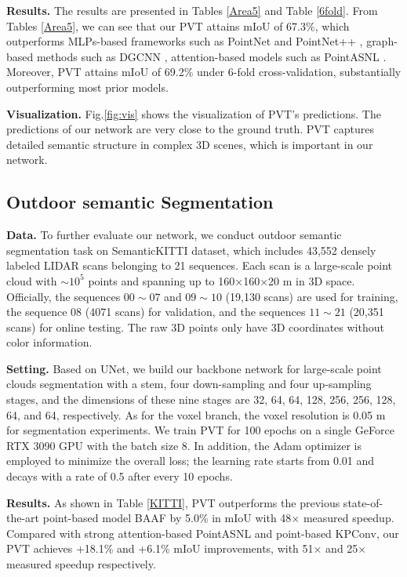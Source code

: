 \documentclass[10pt,twocolumn,letterpaper]{article}
\begin{document}
\textbf{Results.} The results are presented in Tables \ref{Area5} and Table \ref{6fold}. From Tables \ref{Area5}, we can see that our PVT attains mIoU of 67.3\%, which outperforms MLPs-based frameworks such as PointNet \cite{qi2017pointnet} and PointNet++ \cite{qi2017pointnet++}, graph-based methods such as DGCNN \cite{2018Dynamic}, attention-based models such as PointASNL \cite{2020PointASNL}. Moreover, PVT attains mIoU of 69.2\% under 6-fold cross-validation, substantially outperforming most prior models.

\textbf{Visualization.} Fig.\ref{fig:vis} shows the visualization of PVT’s predictions. The predictions of our network are very close to the ground truth. PVT captures detailed semantic structure in complex 3D scenes, which is important in our network.







\subsection{Outdoor semantic Segmentation}
\textbf{Data.} To further evaluate our network, we conduct outdoor semantic segmentation task on SemanticKITTI \cite{semanticKT} dataset, which includes 43,552 densely labeled LIDAR scans belonging to 21 sequences. Each scan is a large-scale point cloud with $\sim10^5$ points and spanning up to 160×160×20 m in 3D space. Officially, the sequences $00\sim07$ and $09\sim10$ (19,130 scans) are used for training, the sequence 08 (4071 scans) for validation, and the sequences $11\sim21$ (20,351 scans) for online testing. The raw 3D points only have 3D coordinates without color information. 

\textbf{Setting. }Based on UNet, we build our backbone network for large-scale point clouds segmentation with a stem, four down-sampling and four up-sampling stages, and the dimensions of these nine stages are 32, 64, 64, 128, 256, 256, 128, 64, and 64, respectively.
As for the voxel branch, the voxel resolution is 0.05 m for segmentation experiments.
We train PVT for 100 epochs on a single GeForce RTX 3090 GPU with the batch size 8. In addition, the Adam optimizer is employed to minimize the overall loss;
the learning rate starts from 0.01 and decays with a rate of 0.5 after every 10 epochs.


\textbf{Results.} As shown in Table \ref{KITTI}, PVT outperforms the previous state-of-the-art point-based model BAAF by 5.0\% in mIoU with 48× measured speedup. Compared with strong attention-based PointASNL and point-based KPConv, our PVT achieves +18.1\% and +6.1\% mIoU improvements, with 51× and 25× measured speedup respectively.
\end{document}
